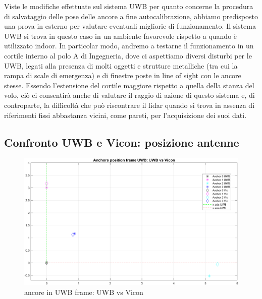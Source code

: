 Viste le modifiche effettuate sul sistema UWB per quanto concerne la procedura di salvataggio delle pose delle ancore a fine autocalibrazione, 
abbiamo predisposto una prova in esterno per valutare eventuali migliorie di funzionamento. Il sistema UWB si trova in questo caso in un ambiente 
favorevole rispetto a quando è utilizzato indoor. In particolar modo, andremo a testarne il funzionamento in un cortile interno al polo A di 
Ingegneria, dove ci aspettiamo diversi disturbi per le UWB, legati alla presenza di molti oggetti e strutture metalliche (tra cui la rampa di 
scale di emergenza) e di finestre poste in line of sight con le ancore stesse.
Essendo l'estensione del cortile maggiore rispetto a quella della stanza del volo, ciò ci consentirà anche di valutare il raggio di azione di 
questo sistema e, di controparte, la difficoltà che può riscontrare il lidar quando si trova in assenza di riferimenti fissi abbastanza vicini, 
come pareti, per l'acquisizione dei suoi dati.

\subsection{Confronto UWB e Vicon: posizione antenne}

\begin{figure}
	\centering
	\includegraphics[height=0.4\textheight]{anchors_UWB_Vicon.png}
	\caption{ancore in UWB frame: UWB vs Vicon}
	\label{fig: ancore in UWB frame, UWB vs Vicon}
\end{figure}

